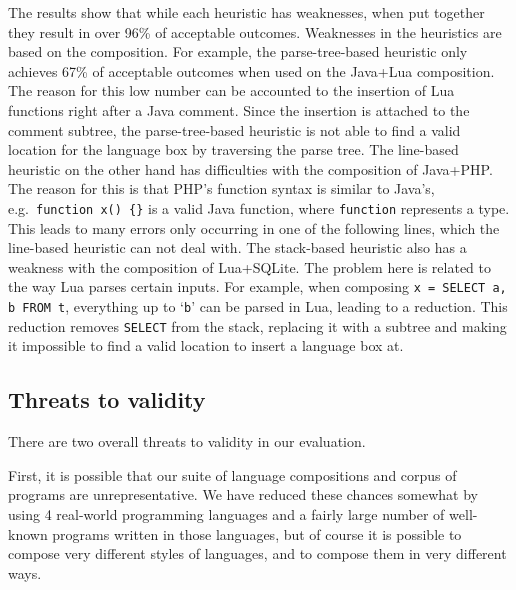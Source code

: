 \documentclass[sigplan,screen]{acmart}\settopmatter{printfolios=true,printccs=false,printacmref=false}
\begin{document}
The results show that while each heuristic has weaknesses, when put together
they result in over 96\% of acceptable outcomes. Weaknesses in the heuristics
are based on the composition. For example, the parse-tree-based heuristic only
achieves 67\% of acceptable outcomes when used on the Java+Lua composition. The
reason for this low number can be accounted to the insertion of Lua functions
right after a Java comment.  Since the insertion is attached to the comment
subtree, the parse-tree-based heuristic is not able to find a valid location for
the language box by traversing the parse tree.  The line-based heuristic on the
other hand has difficulties with the composition of Java+PHP. The reason for
this is that PHP's function syntax is similar to Java's, e.g.~\texttt{function
x() \{\}} is a valid Java function, where \texttt{function} represents a type.
This leads to many errors only occurring in one of the following lines, which
the line-based heuristic can not deal with. The stack-based heuristic also has
a weakness with the composition of Lua+SQLite. The problem here is related to
the way Lua parses certain inputs. For example, when composing \texttt{x =
SELECT a, b FROM t}, everything up to `\texttt{b}' can be parsed in Lua,
leading to a reduction. This reduction removes \texttt{SELECT} from the stack,
replacing it with a subtree and making it impossible to find a valid location
to insert a language box at.


\subsection{Threats to validity}

There are two overall threats to validity in our evaluation.

First, it is possible that our suite of language compositions and corpus of
programs are unrepresentative. We have reduced these chances somewhat by using
4 real-world programming languages and a fairly large number of well-known
programs written in those languages, but of course it is possible to compose
very different styles of languages, and to compose them in very different ways.
\end{document}
